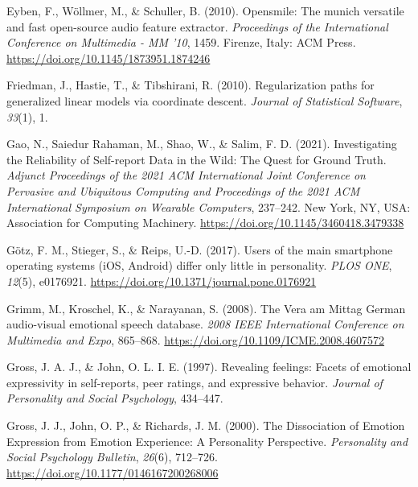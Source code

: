\documentclass[
  english,
  man,floatsintext]{apa6}
\newlength{\cslhangindent}
\newenvironment{CSLReferences}[2] %
 {%
  \setlength{\parindent}{0pt}
  \ifodd #1 \everypar{\setlength{\hangindent}{\cslhangindent}}\ignorespaces\fi
  \ifnum #2 > 0
  \setlength{\parskip}{#2\baselineskip}
  \fi
 }%
 {}
\begin{document}
\begin{CSLReferences}{1}{0}
\leavevmode{}%
Eyben, F., Wöllmer, M., \& Schuller, B. (2010). Opensmile: The munich versatile and fast open-source audio feature extractor. \emph{Proceedings of the International Conference on {Multimedia} - {MM} '10}, 1459. Firenze, Italy: ACM Press. \url{https://doi.org/10.1145/1873951.1874246}

\leavevmode{}%
Friedman, J., Hastie, T., \& Tibshirani, R. (2010). Regularization paths for generalized linear models via coordinate descent. \emph{Journal of Statistical Software}, \emph{33}(1), 1.

\leavevmode{}%
Gao, N., Saiedur Rahaman, M., Shao, W., \& Salim, F. D. (2021). Investigating the {Reliability} of {Self-report Data} in the {Wild}: {The Quest} for {Ground Truth}. \emph{Adjunct {Proceedings} of the 2021 {ACM International Joint Conference} on {Pervasive} and {Ubiquitous Computing} and {Proceedings} of the 2021 {ACM International Symposium} on {Wearable Computers}}, 237--242. New York, NY, USA: Association for Computing Machinery. \url{https://doi.org/10.1145/3460418.3479338}

\leavevmode{}%
Götz, F. M., Stieger, S., \& Reips, U.-D. (2017). Users of the main smartphone operating systems ({iOS}, {Android}) differ only little in personality. \emph{PLOS ONE}, \emph{12}(5), e0176921. \url{https://doi.org/10.1371/journal.pone.0176921}

\leavevmode{}%
Grimm, M., Kroschel, K., \& Narayanan, S. (2008). The {Vera} am {Mittag German} audio-visual emotional speech database. \emph{2008 {IEEE International Conference} on {Multimedia} and {Expo}}, 865--868. \url{https://doi.org/10.1109/ICME.2008.4607572}

\leavevmode{}%
Gross, J. A. J., \& John, O. L. I. E. (1997). Revealing feelings: {Facets} of emotional expressivity in self-reports, peer ratings, and expressive behavior. \emph{Journal of Personality and Social Psychology}, 434--447.

\leavevmode{}%
Gross, J. J., John, O. P., \& Richards, J. M. (2000). The {Dissociation} of {Emotion Expression} from {Emotion Experience}: {A Personality Perspective}. \emph{Personality and Social Psychology Bulletin}, \emph{26}(6), 712--726. \url{https://doi.org/10.1177/0146167200268006}


\end{CSLReferences}
\end{document}
